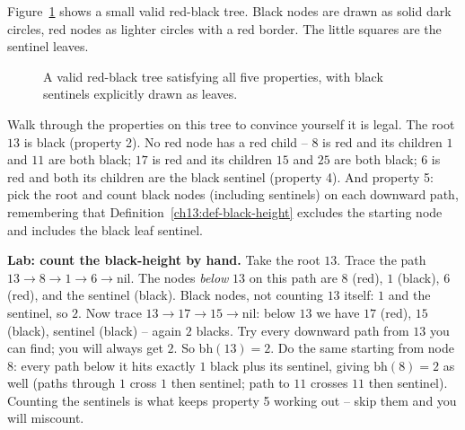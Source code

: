 Figure~\ref{fig:valid-rb-tree} shows a small valid red-black tree. Black nodes are drawn as solid dark
circles, red nodes as lighter circles with a red border. The little squares are
the sentinel leaves.

\begin{figure}[htbp]
\centering
{}
\caption{A valid red-black tree satisfying all five properties, with black sentinels explicitly drawn as leaves.}
\label{fig:valid-rb-tree}
\end{figure}

Walk through the properties on this tree to convince yourself it is legal. The
root $13$ is black (property 2). No red node has a red child -- $8$ is red and its
children $1$ and $11$ are both black; $17$ is red and its children $15$ and $25$
are both black; $6$ is red and both its children are the black sentinel (property
4). And property 5: pick the root and count black nodes (including sentinels) on
each downward path, remembering that Definition~\ref{ch13:def-black-height}
excludes the starting node and includes the black leaf sentinel.

\begin{labbox}
\textbf{Lab: count the black-height by hand.} Take the root $13$. Trace the path
$13 \to 8 \to 1 \to 6 \to \text{nil}$. The nodes \emph{below} $13$ on this path
are $8$ (red), $1$ (black), $6$ (red), and the sentinel (black). Black nodes,
not counting $13$ itself: $1$ and the sentinel, so $2$. Now trace
$13 \to 17 \to 15 \to \text{nil}$: below $13$ we have $17$ (red), $15$ (black),
sentinel (black) -- again $2$ blacks. Try every downward path from $13$ you can
find; you will always get $2$. So $\mathrm{bh}(13) = 2$. Do the same starting
from node $8$: every path below it hits exactly $1$ black plus its sentinel,
giving $\mathrm{bh}(8) = 2$ as well (paths through $1$ cross $1$ then sentinel;
path to $11$ crosses $11$ then sentinel). Counting the sentinels is what keeps
property 5 working out -- skip them and you will miscount.
\end{labbox}

